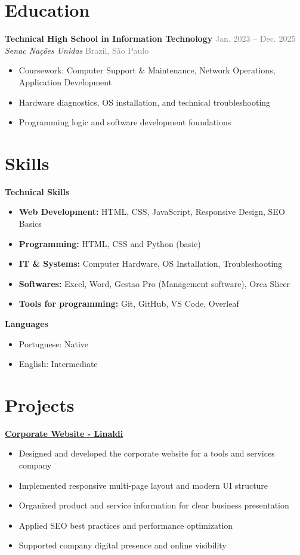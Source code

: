 \documentclass[a4paper, 12pt]{article}
\newcommand{\resumeSubSection}[4]{%
\vspace{-1pt}\noindent
\textbf{#1} \hfill \textcolor{gray}{#2}\\
\textit{#3} \hfill \textcolor{gray}{#4}
}
\newcommand{\resumeItemsSubSection}[1]{%
\vspace{-8pt}\small \begin{itemize}\setlength{\itemsep}{-0.3em}
#1
\end{itemize}
}
\newcommand{\resumeSkillSubsection}[1]{%
\noindent \textbf{#1}\\[-6pt]
}
\begin{document}

\section{Education}
\resumeSubSection
{Technical High School in Information Technology}
{Jan. 2023 -- Dec. 2025}
{Senac Nações Unidas}
{Brazil, São Paulo}

\resumeItemsSubSection{
\item Coursework: Computer Support \& Maintenance, Network Operations, Application Development
\item Hardware diagnostics, OS installation, and technical troubleshooting
\item Programming logic and software development foundations
}


\section{Skills}

\resumeSkillSubsection{Technical Skills}

\resumeItemsSubSection{
\item \textbf{Web Development:} HTML, CSS, JavaScript, Responsive Design, SEO Basics
\item \textbf{Programming:} HTML, CSS and Python (basic)
\item \textbf{IT \& Systems:} Computer Hardware, OS Installation, Troubleshooting
\item \textbf{Softwares:} Excel, Word, Gestao Pro (Management software), Orca Slicer
\item \textbf{Tools for programming:} Git, GitHub, VS Code, Overleaf
}

\resumeSkillSubsection{Languages}
\resumeItemsSubSection{
\item Portuguese: Native
\item English: Intermediate
}


\section{Projects}

\resumeSkillSubsection{\href{https://github.com/nzlinaldi/linaldiWebsite}{Corporate Website - Linaldi}}

\resumeItemsSubSection{
\item Designed and developed the corporate website for a tools and services company
\item Implemented responsive multi-page layout and modern UI structure
\item Organized product and service information for clear business presentation
\item Applied SEO best practices and performance optimization
\item Supported company digital presence and online visibility
}
\end{document}
